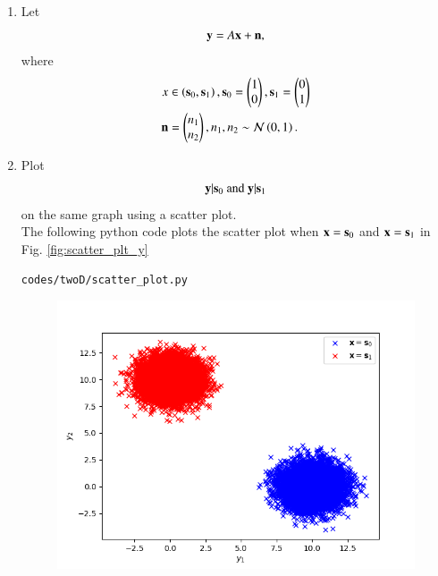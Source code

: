 \begin{enumerate}[label=\thesection.\arabic*.,ref=\thesection.\theenumi]
\item Let 
\begin{equation}
\mathbf{y} = A\mathbf{x} + \mathbf{n},
\end{equation}
where 
\begin{align}
x &\in \left(\mathbf{s}_0,\mathbf{s}_1\right), 
\mathbf{s}_0 = 
\begin{pmatrix}
1 
\\
0
\end{pmatrix},
\mathbf{s}_1 = 
\begin{pmatrix}
0 
\\
1
\end{pmatrix}
\\
\mathbf{n} &= 
\begin{pmatrix}
n_1
\\
n_2
\end{pmatrix},
n_1,n_2 \sim \mathcal{N}\left(0,1\right).
\end{align}
%
\item
Plot 
%
\begin{equation}
\mathbf{y}|\mathbf{s}_0 \text{ and } \mathbf{y}|\mathbf{s}_1
\end{equation}
%
on the same graph using a scatter plot.
\\
\clearpage
\solution The following python code plots the scatter plot when $\mathbf{x} = \mathbf{s}_0$ and $\mathbf{x} = \mathbf{s}_1$ in Fig. \ref{fig:scatter_plt_y}
\begin{lstlisting}
codes/twoD/scatter_plot.py
\end{lstlisting}
\begin{figure}
\centering
\includegraphics[width=\columnwidth]{./figs/twoD/scatter_plot.png}

\end{figure}
\end{enumerate}
